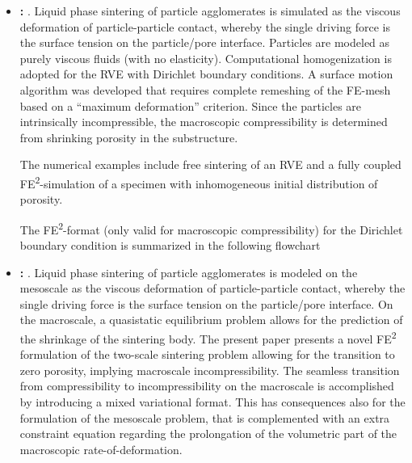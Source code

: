 \documentclass[MikaelDissertation.tex]{subfiles}
\begin{document}
\begin{itemize}
 \item \textbf{: }.
Liquid phase sintering of particle agglomerates is simulated as the viscous deformation of particle-particle contact, whereby the single driving force is the surface tension on the particle/pore interface.
Particles are modeled as purely viscous fluids (with no elasticity). 
Computational homogenization is adopted for the RVE with Dirichlet boundary conditions.
A surface motion algorithm was developed that requires complete remeshing of the FE-mesh based on a ``maximum deformation'' criterion. 
Since the particles are intrinsically incompressible, the macroscopic compressibility is determined from shrinking porosity in the substructure.

The numerical examples include free sintering of an RVE and a fully coupled FE\textsuperscript{2}-simulation of a specimen with inhomogeneous initial distribution of porosity.

The FE\textsuperscript{2}-format (only valid for macroscopic compressibility) for the Dirichlet boundary condition is summarized in the following flowchart
\begin{center}
  
\end{center}

 \item \textbf{: }.
Liquid phase sintering of particle agglomerates is modeled on the mesoscale as the viscous deformation of particle-particle contact, whereby the single driving force is the surface tension on the particle/pore interface.
On the macroscale, a quasistatic equilibrium problem allows for the prediction of the shrinkage of the sintering body. 
The present paper presents a novel FE\textsuperscript{2} formulation of the two-scale sintering problem allowing for the transition to zero porosity, implying macroscale incompressibility.
The seamless transition from compressibility to incompressibility on the macroscale is accomplished by introducing a mixed variational format.
This has consequences also for the formulation of the mesoscale problem, that is complemented with an extra constraint equation regarding the prolongation of the volumetric part of the macroscopic rate-of-deformation.


\end{itemize}
\end{document}
